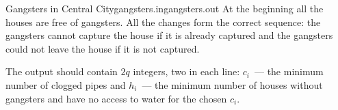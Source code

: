\begin{problem}{Gangsters in Central City}{gangsters.in}{gangsters.out}{\timeLimit}
At the beginning all the houses are free of gangsters. 
All the changes form the correct sequence:
the gangsters cannot capture the house if it is already captured
and the gangsters could not leave the house if it is not captured.

\OutputFile

The output should contain $2q$ integers, two in each line:
$c_i$~--- the minimum number of clogged pipes and
$h_i$~--- the minimum number of houses without gangsters and have no access to water
for the chosen $c_i$.

\Example

\begin{example}
%
\end{example}%

\end{problem}
